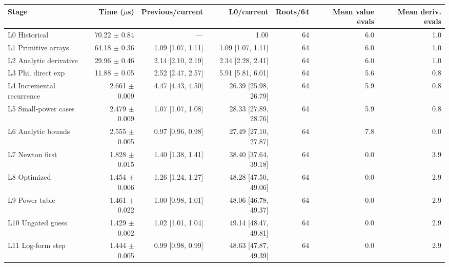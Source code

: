 \begin{tabular}{lrrrrrr}
\toprule
Stage & Time ($\mu$s) & Previous/current & L0/current & Roots/64 & Mean value evals & Mean deriv. evals \\
\midrule
L0 Historical & 70.22 $\pm$ 0.84 & --- & 1.00 & 64 & 6.0 & 1.0 \\
L1 Primitive arrays & 64.18 $\pm$ 0.36 & 1.09 [1.07, 1.11] & 1.09 [1.07, 1.11] & 64 & 6.0 & 1.0 \\
L2 Analytic derivative & 29.96 $\pm$ 0.46 & 2.14 [2.10, 2.19] & 2.34 [2.28, 2.41] & 64 & 6.0 & 1.0 \\
L3 Phi, direct exp & 11.88 $\pm$ 0.05 & 2.52 [2.47, 2.57] & 5.91 [5.81, 6.01] & 64 & 5.6 & 0.8 \\
L4 Incremental recurrence & 2.661 $\pm$ 0.009 & 4.47 [4.43, 4.50] & 26.39 [25.98, 26.79] & 64 & 5.9 & 0.8 \\
L5 Small-power cases & 2.479 $\pm$ 0.009 & 1.07 [1.07, 1.08] & 28.33 [27.89, 28.76] & 64 & 5.9 & 0.8 \\
L6 Analytic bounds & 2.555 $\pm$ 0.005 & 0.97 [0.96, 0.98] & 27.49 [27.10, 27.87] & 64 & 7.8 & 0.0 \\
L7 Newton first & 1.828 $\pm$ 0.015 & 1.40 [1.38, 1.41] & 38.40 [37.64, 39.18] & 64 & 0.0 & 3.9 \\
L8 Optimized & 1.454 $\pm$ 0.006 & 1.26 [1.24, 1.27] & 48.28 [47.50, 49.06] & 64 & 0.0 & 2.9 \\
L9 Power table & 1.461 $\pm$ 0.022 & 1.00 [0.98, 1.01] & 48.06 [46.78, 49.37] & 64 & 0.0 & 2.9 \\
L10 Ungated guess & 1.429 $\pm$ 0.002 & 1.02 [1.01, 1.04] & 49.14 [48.47, 49.81] & 64 & 0.0 & 2.9 \\
L11 Log-form step & 1.444 $\pm$ 0.005 & 0.99 [0.98, 0.99] & 48.63 [47.87, 49.39] & 64 & 0.0 & 2.9 \\
\bottomrule
\end{tabular}
